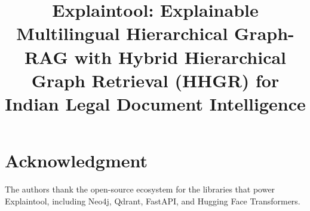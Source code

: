 \documentclass[conference,10pt]{IEEEtran}
\begin{document}
\title{Explaintool: Explainable Multilingual Hierarchical Graph-RAG with Hybrid
Hierarchical Graph Retrieval (HHGR) for Indian Legal Document Intelligence}

\author{
}

\maketitle









\section*{Acknowledgment}
The authors thank the open-source ecosystem for the libraries that power
Explaintool, including Neo4j, Qdrant, FastAPI, and Hugging Face Transformers.



\end{document}
